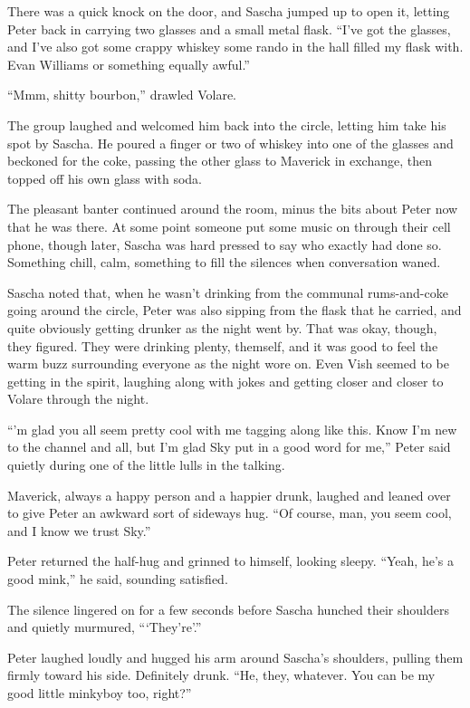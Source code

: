 There was a quick knock on the door, and Sascha jumped up to open it, letting Peter back in carrying two glasses and a small metal flask. ``I've got the glasses, and I've also got some crappy whiskey some rando in the hall filled my flask with. Evan Williams or something equally awful.''

``Mmm, shitty bourbon,'' drawled Volare.

The group laughed and welcomed him back into the circle, letting him take his spot by Sascha. He poured a finger or two of whiskey into one of the glasses and beckoned for the coke, passing the other glass to Maverick in exchange, then topped off his own glass with soda.

The pleasant banter continued around the room, minus the bits about Peter now that he was there. At some point someone put some music on through their cell phone, though later, Sascha was hard pressed to say who exactly had done so. Something chill, calm, something to fill the silences when conversation waned.

Sascha noted that, when he wasn't drinking from the communal rums-and-coke going around the circle, Peter was also sipping from the flask that he carried, and quite obviously getting drunker as the night went by. That was okay, though, they figured. They were drinking plenty, themself, and it was good to feel the warm buzz surrounding everyone as the night wore on. Even Vish seemed to be getting in the spirit, laughing along with jokes and getting closer and closer to Volare through the night.

``'m glad you all seem pretty cool with me tagging along like this. Know I'm new to the channel and all, but I'm glad Sky put in a good word for me,'' Peter said quietly during one of the little lulls in the talking.

Maverick, always a happy person and a happier drunk, laughed and leaned over to give Peter an awkward sort of sideways hug. ``Of course, man, you seem cool, and I know we trust Sky.''

Peter returned the half-hug and grinned to himself, looking sleepy. ``Yeah, he's a good mink,'' he said, sounding satisfied.

The silence lingered on for a few seconds before Sascha hunched their shoulders and quietly murmured, ```They're'.''

Peter laughed loudly and hugged his arm around Sascha's shoulders, pulling them firmly toward his side. Definitely drunk. ``He, they, whatever. You can be my good little minkyboy too, right?''

